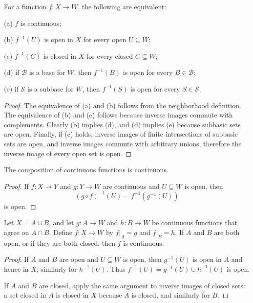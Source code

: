 \begin{thm}
For a function $f:X\to W$, the following are equivalent:

(a) $f$ is continuous;

(b) $f^{-1}(U)$ is open in $X$ for every open $U\subseteq W$;

(c) $f^{-1}(C)$ is closed in $X$ for every closed $C\subseteq W$;

(d) if $\mathcal{B}$ is a base for $W$, then $f^{-1}(B)$ is open for every
$B\in\mathcal{B}$;

(e) if $\mathcal{S}$ is a subbase for $W$, then $f^{-1}(S)$ is open for every
$S\in\mathcal{S}$.
\end{thm}

\begin{proof}
The equivalence of (a) and (b) follows from the neighborhood definition. The
equivalence of (b) and (c) follows because inverse images commute with
complements. Clearly (b) implies (d), and (d) implies (e) because subbasic
sets are open. Finally, if (e) holds, inverse images of finite intersections
of subbasic sets are open, and inverse images commute with arbitrary unions;
therefore the inverse image of every open set is open.
\end{proof}

\begin{thm}
The composition of continuous functions is continuous.
\end{thm}

\begin{proof}
If $f:X\to Y$ and $g:Y\to W$ are continuous and $U\subseteq W$ is open,
then
\[
(g\circ f)^{-1}(U)=f^{-1}(g^{-1}(U))
\]
is open.
\end{proof}

\begin{thm}
Let $X=A\cup B$, and let $g:A\to W$ and $h:B\to W$ be continuous functions
that agree on $A\cap B$. Define $f:X\to W$ by $f|_A=g$ and $f|_B=h$. If
$A$ and $B$ are both open, or if they are both closed, then $f$ is
continuous.
\end{thm}

\begin{proof}
If $A$ and $B$ are open and $U\subseteq W$ is open, then $g^{-1}(U)$ is open
in $A$ and hence in $X$; similarly for $h^{-1}(U)$. Thus
$f^{-1}(U)=g^{-1}(U)\cup h^{-1}(U)$ is open.

If $A$ and $B$ are closed, apply the same argument to inverse images of
closed sets: a set closed in $A$ is closed in $X$ because $A$ is closed, and
similarly for $B$.
\end{proof}

